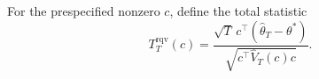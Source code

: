 For the prespecified nonzero \(c\), define the total statistic
\[
 T_T^{\mathrm{rqv}}(c)=
 \frac{\sqrt T\,c^\top(\widehat\theta_T-\theta^*)}
 {\sqrt{c^\top\widehat V_T(c)c}}.
\]